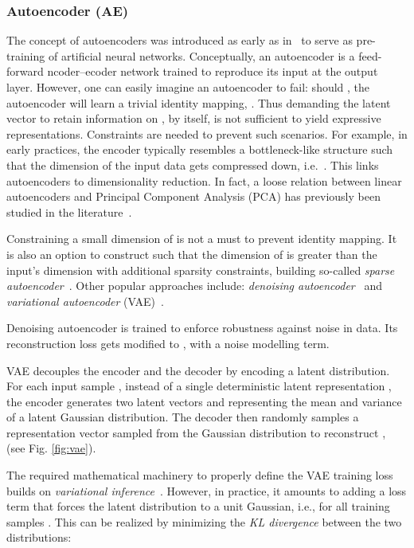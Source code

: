 \documentclass[lettersize,journal]{IEEEtran}
\begin{document}
\subsubsection{Autoencoder (AE)}

The concept of autoencoders was introduced as early as in~\cite{ballard1987modular} to serve as
pre-training of artificial neural networks. Conceptually, an autoencoder  is a feed-forward ncoder--ecoder network trained to reproduce its input at the output layer. However, one can easily imagine an autoencoder to fail: should , the autoencoder will learn a trivial identity mapping, . Thus demanding the latent vector  to retain information on , by itself, is not sufficient to yield expressive representations. Constraints are needed to prevent such scenarios. For example, in early practices, the encoder  typically resembles a bottleneck-like structure such that the dimension of the input data gets compressed down, i.e.\ . This links autoencoders to dimensionality reduction. In fact, a loose relation between linear autoencoders and Principal Component Analysis (PCA) \cite{wold1987principal} has previously been studied in the literature~\cite{plaut2018principal}.

Constraining a small dimension of  is not a must to prevent identity mapping. It is also an option to construct  such that the dimension of  is greater than the input's  dimension with additional sparsity constraints, building so-called \textit{sparse autoencoder}~\cite{ng2011sparse}. Other popular approaches include: \textit{denoising autoencoder}~\cite{vincent2010stacked} and \textit{variational autoencoder} (VAE)~\cite{kingma2013auto}.

Denoising autoencoder is trained to enforce robustness against noise in data. Its reconstruction loss
gets modified to , with  a noise modelling term. 

VAE decouples the encoder and the decoder by encoding a latent distribution. For each input sample , instead of a single deterministic latent representation , the encoder  generates two latent vectors  and  representing the mean and variance of a latent Gaussian distribution. The decoder then randomly samples a representation vector  sampled from the Gaussian distribution  to reconstruct , (see Fig. \ref{fig:vae}).

The required mathematical machinery to properly define the VAE training loss builds on \textit{variational inference}~\cite{blei2017variational}. However, in practice, it amounts to adding a loss term that forces the latent distribution to a unit Gaussian, i.e.,  for all training samples . This can be realized by minimizing the \textit{KL divergence} between the two distributions:
\end{document}
